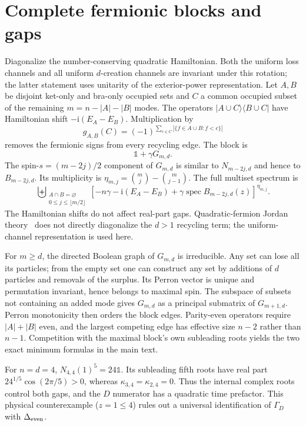 \documentclass[aps,pra,reprint,superscriptaddress,nofootinbib,floatfix]{revtex4-2}
\newcommand{\spec}{\operatorname{spec}}
\newcommand{\ii}{\mathrm{i}}
\begin{document}
\section{Complete fermionic blocks and gaps}
Diagonalize the number-conserving quadratic Hamiltonian. Both the uniform loss channels and all uniform $d$-creation channels are invariant under this rotation; the latter statement uses unitarity of the exterior-power representation. Let $A,B$ be disjoint ket-only and bra-only occupied sets and $C$ a common occupied subset of the remaining $m=n-|A|-|B|$ modes. The operators $|A\cup C\rangle\langle B\cup C|$ have Hamiltonian shift $-\ii(E_A-E_B)$. Multiplication by
\begin{equation}
g_{A,B}(C)=(-1)^{\sum_{c\in C}|\{f\in A\cup B:f<c\}|}
\end{equation}
removes the fermionic signs from every recycling edge. The block is
\begin{equation}
[-n\gamma-\ii(E_A-E_B)]\mathbb1+\gamma G_{m,d}.
\end{equation}
The spin-$s=(m-2j)/2$ component of $G_{m,d}$ is similar to $N_{m-2j,d}$ and hence to $B_{m-2j,d}$. Its multiplicity is $\eta_{m,j}=\binom mj-\binom m{j-1}$. The full multiset spectrum is
\begin{equation}
\biguplus_{\substack{A\cap B=\varnothing\\0\le j\le\lfloor m/2\rfloor}}
\left[-n\gamma-\ii(E_A-E_B)+\gamma\spec B_{m-2j,d}(z)\right]^{\eta_{m,j}}.
\label{eq:full}
\end{equation}
The Hamiltonian shifts do not affect real-part gaps. Quadratic-fermion Jordan theory~\cite{Prosen} does not directly diagonalize the $d>1$ recycling term; the uniform-channel representation is used here.

For $m\ge d$, the directed Boolean graph of $G_{m,d}$ is irreducible. Any set can lose all its particles; from the empty set one can construct any set by additions of $d$ particles and removals of the surplus. Its Perron vector is unique and permutation invariant, hence belongs to maximal spin. The subspace of subsets not containing an added mode gives $G_{m,d}$ as a principal submatrix of $G_{m+1,d}$. Perron monotonicity then orders the block edges. Parity-even operators require $|A|+|B|$ even, and the largest competing edge has effective size $n-2$ rather than $n-1$. Competition with the maximal block's own subleading roots yields the two exact minimum formulas in the main text.

For $n=d=4$, $N_{4,4}(1)^5=24\mathbb1$. Its subleading fifth roots have real part $24^{1/5}\cos(2\pi/5)>0$, whereas $\kappa_{3,4}=\kappa_{2,4}=0$. Thus the internal complex roots control both gaps, and the $D$ numerator has a quadratic time prefactor. This physical counterexample ($z=1\le4$) rules out a universal identification of $\Gamma_D$ with $\Delta_{\rm even}$.
\end{document}
